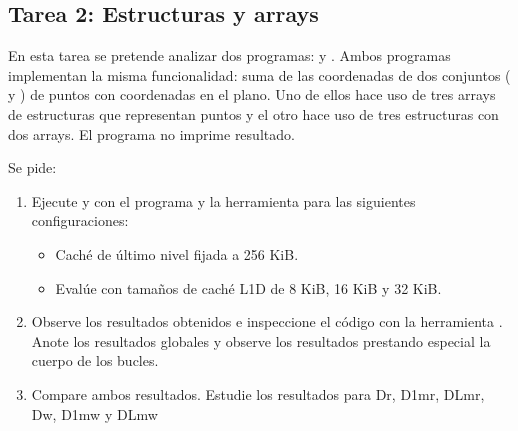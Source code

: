 \clearpage
\subsection{Tarea 2: Estructuras y arrays}

En esta tarea se pretende analizar dos programas:  y
. Ambos programas implementan la misma funcionalidad: suma de las
coordenadas de dos conjuntos ( y ) de puntos con coordenadas en el plano.
Uno de ellos hace uso de tres arrays de estructuras que representan puntos y el otro hace uso de tres estructuras con dos arrays. El programa no imprime resultado.




Se pide: 

\begin{enumerate}

\item Ejecute  y  con el programa  y la herramienta  para las siguientes configuraciones:

\begin{itemize}
\item Caché de último nivel fijada a 256 KiB.
\item Evalúe con tamaños de caché L1D de 8 KiB, 16 KiB y 32 KiB.
\end{itemize}

\item Observe los resultados obtenidos e inspeccione el código con la
herramienta . Anote los resultados globales y observe
los resultados prestando especial la cuerpo de los bucles.

\item Compare ambos resultados.
Estudie los resultados para Dr, D1mr, DLmr, Dw, D1mw y DLmw

\end{enumerate}


